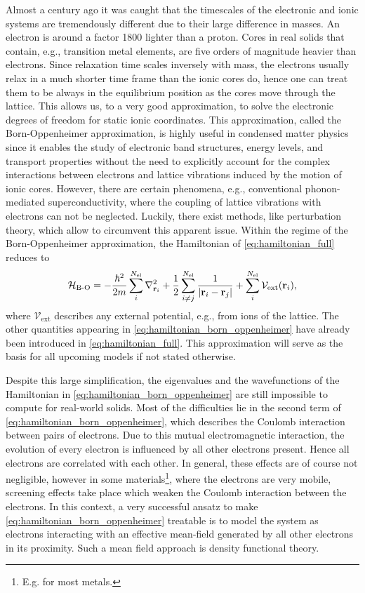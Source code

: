 \documentclass[../../main.tex]{subfiles}
\begin{document}
Almost a century ago it was caught that the timescales of the electronic and ionic systems are tremendously different due to their large difference in masses. An electron is around a factor 1800 lighter than a proton. Cores in real solids that contain, e.g., transition metal elements, are five orders of magnitude heavier than electrons. Since relaxation time scales inversely with mass, the electrons usually relax in a much shorter time frame than the ionic cores do, hence one can treat them to be always in the equilibrium position as the cores move through the lattice. This allows us, to a very good approximation, to solve the electronic degrees of freedom for static ionic coordinates. This approximation, called the Born-Oppenheimer approximation, is highly useful in condensed matter physics since it enables the study of electronic band structures, energy levels, and transport properties without the need to explicitly account for the complex interactions between electrons and lattice vibrations induced by the motion of ionic cores. However, there are certain phenomena, e.g., conventional phonon-mediated superconductivity, where the coupling of lattice vibrations with electrons can not be neglected. Luckily, there exist methods, like perturbation theory, which allow to circumvent this apparent issue. Within the regime of the Born-Oppenheimer approximation, the Hamiltonian of \eqref{eq:hamiltonian_full} reduces to
\begin{align}\label{eq:hamiltonian_born_oppenheimer}
	\mathcal{H}_{\text{B-O}}=-\frac{\hbar^2}{2m}\sum_i^{N_{\text{el}}} \nabla^2_{\textbf{r}_i}+\frac 12\sum_{i\neq j}^{N_{\text{el}}} \frac{1}{|\textbf{r}_i-\textbf{r}_j|}+\sum_i^{N_{\text{el}}}\mathcal{V}_{\text{ext}}(\textbf{r}_i),
\end{align}
where $\mathcal{V}_{\text{ext}}$ describes any external potential, e.g., from ions of the lattice. The other quantities appearing in \eqref{eq:hamiltonian_born_oppenheimer} have already been introduced in \eqref{eq:hamiltonian_full}. This approximation will serve as the basis for all upcoming models if not stated otherwise.

Despite this large simplification, the eigenvalues and the wavefunctions of the Hamiltonian in \eqref{eq:hamiltonian_born_oppenheimer} are still impossible to compute for real-world solids. Most of the difficulties lie in the second term of \eqref{eq:hamiltonian_born_oppenheimer}, which describes the Coulomb interaction between pairs of electrons. Due to this mutual electromagnetic interaction, the evolution of every electron is influenced by all other electrons present. Hence all electrons are correlated with each other. In general, these effects are of course not negligible, however in some materials\footnote{E.g. for most metals.}, where the electrons are very mobile, screening effects take place which weaken the Coulomb interaction between the electrons. In this context, a very successful ansatz to make \eqref{eq:hamiltonian_born_oppenheimer} treatable is to model the system as electrons interacting with an effective mean-field generated by all other electrons in its proximity. Such a mean field approach is density functional theory. 
\end{document}
